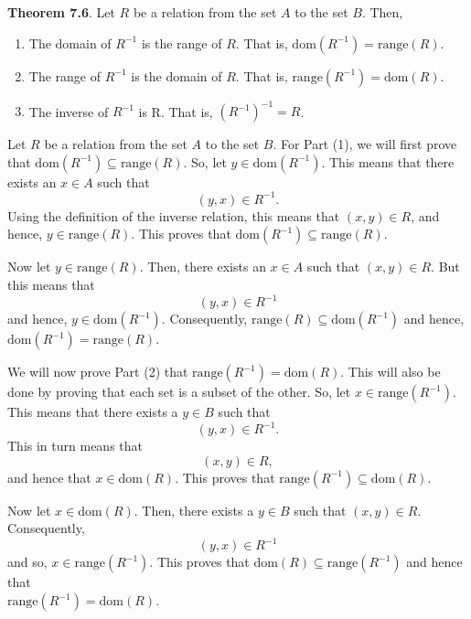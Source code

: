 \documentclass[11pt]{article}
\begin{document}
\noindent
\textbf{Theorem 7.6}.  Let  $R$  be a relation from the set  $A$  to the set  $B$.  Then,
\begin{enumerate}
\item The domain of  $R^{ - 1} $ is the range of  $R$.  That is, 
$\text{dom}\left( {R^{ - 1} } \right) = \text{range}\left( R \right)$.

\item The range of  $R^{ - 1} $  is the domain of  $R$.   That is, 
$\text{range}\left( {R^{ - 1} } \right) = \text{dom}\left( R \right)$.

\item The inverse of  $R^{ - 1} $  is  R.  That is, $\left( {R^{ - 1} } \right)^{ - 1}  = R$.
\end{enumerate}

\begin{myproof}
Let  $R$  be a relation from the set  $A$  to the set  $B$.  For Part (1), we will first prove that  $\text{dom}\left( {R^{ - 1} } \right) \subseteq \text{range}\left( R \right)$.  So, let  
$y \in \text{dom}\left( {R^{ - 1} } \right)$.  This means that there exists an  $x \in A$ such that
\[
\left( {y, x} \right) \in R^{ - 1}.
\]
Using the definition of the inverse relation, this means that  $\left( {x, y} \right) \in R$, and hence,  $y \in \text{range}\left( R \right)$.  This proves that  
$\text{dom}\left( {R^{ - 1} } \right) \subseteq \text{range}\left( R \right)$.

Now let  $y \in \text{range}\left( R \right)$.  Then, there exists an  $x \in A$ such that  
$\left( {x, y} \right) \in R$.  But this means that  
\[
\left( {y, x} \right) \in R^{ - 1} 
\]
and hence,  $y \in \text{dom}\left( {R^{ - 1} } \right)$.  Consequently,  
$\text{range}\left( R \right) \subseteq \text{dom}\left( {R^{ - 1} } \right)$ and hence, 
$\text{dom}\left( {R^{ - 1} } \right) = \text{range}\left( R \right)$.
\vskip6pt

We will now prove Part (2) that  
$\text{range}\left( {R^{ - 1} } \right) = \text{dom}\left( R \right)$.  This will also be done by proving that each set is a subset of the other.  So, let  
$x \in \text{range}\left( {R^{ - 1} } \right)$. This means that there exists a  $y \in B$ such that  
\[
\left( {y, x} \right) \in R^{ - 1}.
\]
This in turn means that
\[
\left( {x, y} \right) \in R,
\]
and hence that  $x \in \text{dom}\left( R \right)$.  This proves that  
$\text{range}\left( {R^{ - 1} } \right) \subseteq \text{dom}\left( R \right)$. 

Now let $x \in \text{dom}\left( R \right)$.  Then, there exists a  $y \in B$ such that  
$\left( {x, y} \right) \in R$.  Consequently,  
\[
\left( {y, x} \right) \in R^{ - 1} 
\]
and so, $x \in \text{range}\left( {R^{ - 1} } \right)$.  This proves that  
$\text{dom}\left( R \right) \subseteq \text{range}\left( {R^{ - 1} } \right)$ and hence that \\ $\text{range}\left( {R^{ - 1} } \right) = \text{dom}\left( R \right)$.
\vskip6pt


\end{myproof}
\end{document}
